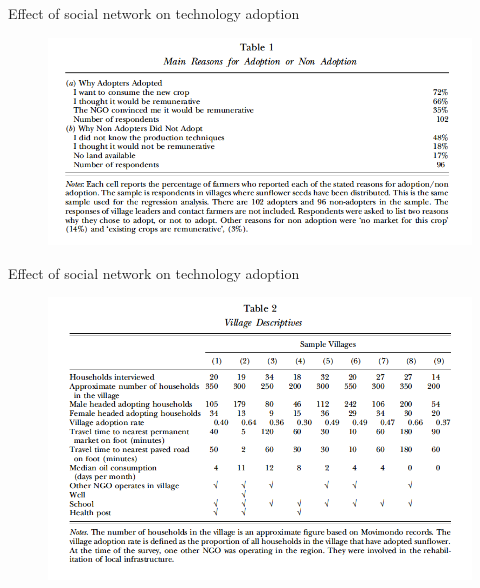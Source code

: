\documentclass{beamer}
\begin{document}
\begin{frame}{Effect of social network on technology adoption}{}
\begin{figure}[h]
\begin{centering}
  \includegraphics[width=\textwidth]{01table1}
   \label{fig:01table1}
\end{centering}
\end{figure}
\end{frame}

\begin{frame}{Effect of social network on technology adoption}{}
\begin{figure}[h]
\begin{centering}
  \includegraphics[width=\textwidth]{01table2}
   \label{fig:01table2}
\end{centering}
\end{figure}
\end{frame}
\end{document}
